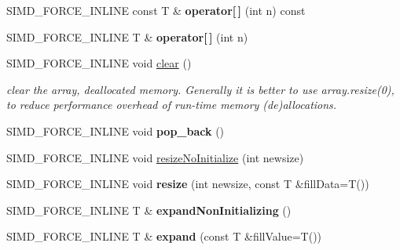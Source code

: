 \begin{DoxyCompactItemize}
\mbox{\label{classbtAlignedObjectArray_a20eda69c4274d87170a6bd2d9ea97054}} 
S\+I\+M\+D\+\_\+\+F\+O\+R\+C\+E\+\_\+\+I\+N\+L\+I\+NE const T \& {\bfseries operator\mbox{[}$\,$\mbox{]}} (int n) const
\item 
\mbox{\label{classbtAlignedObjectArray_a29680dc26edbd4691d7b6a43d5a60840}} 
S\+I\+M\+D\+\_\+\+F\+O\+R\+C\+E\+\_\+\+I\+N\+L\+I\+NE T \& {\bfseries operator\mbox{[}$\,$\mbox{]}} (int n)
\item 
\mbox{\label{classbtAlignedObjectArray_a12123db01dda7758f0df5e3bba10cc0a}} 
S\+I\+M\+D\+\_\+\+F\+O\+R\+C\+E\+\_\+\+I\+N\+L\+I\+NE void \hyperlink{classbtAlignedObjectArray_a12123db01dda7758f0df5e3bba10cc0a}{clear} ()
\begin{DoxyCompactList}\small\item\em clear the array, deallocated memory. Generally it is better to use array.\+resize(0), to reduce performance overhead of run-\/time memory (de)allocations. \end{DoxyCompactList}\item 
\mbox{\label{classbtAlignedObjectArray_a6169be905e03b84ea3bc8d8f7c7fc39d}} 
S\+I\+M\+D\+\_\+\+F\+O\+R\+C\+E\+\_\+\+I\+N\+L\+I\+NE void {\bfseries pop\+\_\+back} ()
\item 
S\+I\+M\+D\+\_\+\+F\+O\+R\+C\+E\+\_\+\+I\+N\+L\+I\+NE void \hyperlink{classbtAlignedObjectArray_a2cc58c74534181a7a10e5c6ab8b21227}{resize\+No\+Initialize} (int newsize)
\item 
\mbox{\label{classbtAlignedObjectArray_a6a48cd9cb91d0cfa50ee1c70ef485190}} 
S\+I\+M\+D\+\_\+\+F\+O\+R\+C\+E\+\_\+\+I\+N\+L\+I\+NE void {\bfseries resize} (int newsize, const T \&fill\+Data=T())
\item 
\mbox{\label{classbtAlignedObjectArray_ad1f99f070780c42619386fd2a4336bec}} 
S\+I\+M\+D\+\_\+\+F\+O\+R\+C\+E\+\_\+\+I\+N\+L\+I\+NE T \& {\bfseries expand\+Non\+Initializing} ()
\item 
\mbox{\label{classbtAlignedObjectArray_ad64affb4ed3f9db81f832cbac6b62527}} 
S\+I\+M\+D\+\_\+\+F\+O\+R\+C\+E\+\_\+\+I\+N\+L\+I\+NE T \& {\bfseries expand} (const T \&fill\+Value=T())

\end{DoxyCompactItemize}
